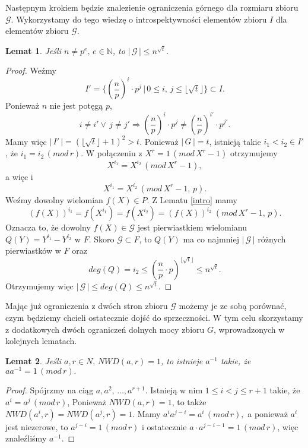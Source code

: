 \documentclass[declaration,shortabstract]{iithesis}
\theoremstyle{definition}
\theoremstyle{remark} \newtheorem{observation}{Obserwacja}
\theoremstyle{plain} \newtheorem{theorem}{Twierdzenie}
\theoremstyle{plain} \newtheorem{lemma}{Lemat}
\theoremstyle{remark} \newtheorem*{remark*}{Uwaga}
\theoremstyle{reminder} \newtheorem*{reminder*}{Przypomnienie}
\begin{document}
Następnym krokiem będzie znalezienie ograniczenia górnego dla rozmiaru zbioru $\mathcal{G}$. Wykorzystamy do tego wiedzę o introspektywności elementów zbioru $I$ dla elementów zbioru $\mathcal{G}$.

\begin{lemma} \label{upper}
	Jeśli $n \neq p^e, \, e \in \mathbb{N}$, to $| \, \mathcal{G} \, | \leq n^{\sqrt{t}}$.
\end{lemma}
	
\begin{proof}
	Weźmy \[I' = \{(\frac{n}{p})^i \cdot p^j \, | \, 0 \leq i, \, j \leq \lfloor \sqrt{t} \rfloor \} \subset I.\] Ponieważ $n$ nie jest potęgą $p$, \[i \neq i' \vee \, j \neq j' \Rightarrow (\frac{n}{p})^i \cdot p^j \neq (\frac{n}{p})^{i'} \cdot p^{j'}.\] Mamy więc $| \, I' \, | = (\lfloor \sqrt{t} \rfloor + 1)^2 > t$. Ponieważ $| \, G \, | = t$, istnieją takie ${i_1 < i_2 \in I'}$, że $i_1 = i_2 \, (mod \, r)$. W połączeniu z $X^r = 1 \, (mod \, X^r - 1)$ otrzymujemy \[X^{i_1} = X^{i_2} \, (mod \, X^r - 1),\] a więc i \[X^{i_1} = X^{i_2} \, (mod \, X^r - 1, \, p).\]  Weźmy dowolny wielomian $f(X) \in P$. Z Lematu \ref{intro} mamy \[(f(X))^{i_1} = f(X^{i_1}) = f(X^{i_2}) = (f(X))^{i_2} \; (mod \,  X^r - 1, \, p).\] Oznacza to, że dowolny $f(X) \in \mathcal{G}$ jest pierwiastkiem wielomianu $Q(Y) = Y^{i_1} - Y^{i_2}$ w $F$. Skoro $\mathcal{G} \subset F$, to $Q(Y)$ ma co najmniej $| \, \mathcal{G} \, |$ różnych pierwiastków w $F$ oraz \[deg(Q) = i_2 \leq (\frac{n}{p} \cdot p)^{\lfloor \sqrt{t} \rfloor} \leq n^{\sqrt{t}}.\] Otrzymujemy więc $| \, \mathcal{G} \, | \leq deg(Q) \leq n^{\sqrt{t}}$.
\end{proof}

Mając już ograniczenia z dwóch stron zbioru $\mathcal{G}$ możemy je ze sobą porównać, czym będziemy chcieli ostatecznie dojść do sprzeczności. W tym celu skorzystamy z dodatkowych dwóch ograniczeń dolnych mocy zbioru $G$, wprowadzonych w kolejnych lematach.

\begin{lemma}\label{odwrotny}
	Jeśli $a, r \in N, \, NWD(a, r) = 1$, to istnieje $a^{-1}$ takie, że $aa^{-1} = 1 \, (mod \, r).$
\end{lemma}
	
\begin{proof}
	Spójrzmy na ciąg $a, a^2, \, \dots, a^{r+1}$. Istnieją w nim $1 \leq i < j \leq r + 1$ takie, że $a^i = a^j \, (mod \, r)$, Ponieważ $NWD(a, r) = 1$, to także $NWD(a^i, r) = NWD(a^j, r) = 1$. Mamy $a^ia^{j-i} = a^i \, (mod \, r),$ a ponieważ $a^i$ jest niezerowe, to $a^{j - i} = 1 \, (mod \, r)$ i ostatecznie $a \cdot a^{j - i - 1} = 1 \, (mod \, r)$, więc znaleźliśmy $a^{-1}$.
\end{proof}
\end{document}
